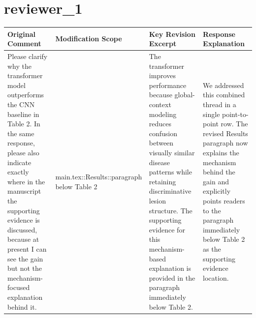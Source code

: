 \documentclass{article}
\begin{document}
\section*{ reviewer\_1 }
\begin{longtable}{|p{}|p{}|p{}|p{}|}
\hline
Original Comment & Modification Scope & Key Revision Excerpt & Response Explanation \\
\hline
Please clarify why the transformer model outperforms the CNN baseline in Table 2. In the same response, please also indicate exactly where in the manuscript the supporting evidence is discussed, because at present I can see the gain but not the mechanism-focused explanation behind it. & main.tex::Results::paragraph below Table 2 & The transformer improves performance because global-context modeling reduces confusion between visually similar disease patterns while retaining discriminative lesion structure. The supporting evidence for this mechanism-based explanation is provided in the paragraph immediately below Table 2. & We addressed this combined thread in a single point-to-point row. The revised Results paragraph now explains the mechanism behind the gain and explicitly points readers to the paragraph immediately below Table 2 as the supporting evidence location. \\
\hline
\end{longtable}
\end{document}
